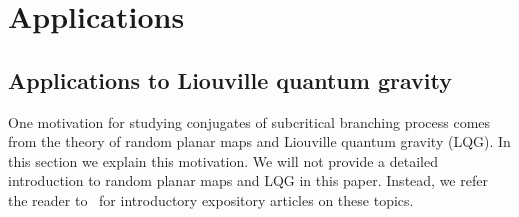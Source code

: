 \documentclass[11pt]{article}
\theoremstyle{plain}
\theoremstyle{definition}
\numberwithin{equation}{section}
\newcommand{\BB}{\mathbbm}
\begin{document}
  

\section{Applications}
 
\subsection{Applications to Liouville quantum gravity}
\label{sec-lqg}

One motivation for studying conjugates of subcritical branching process comes from the theory of random planar maps and Liouville quantum gravity (LQG). In this section we explain this motivation. We will not provide a detailed introduction to random planar maps and LQG in this paper. Instead, we refer the reader to~\cite{bp-lqg-notes,gwynne-ams-survey,sheffield-icm} for introductory expository articles on these topics.
\end{document}
